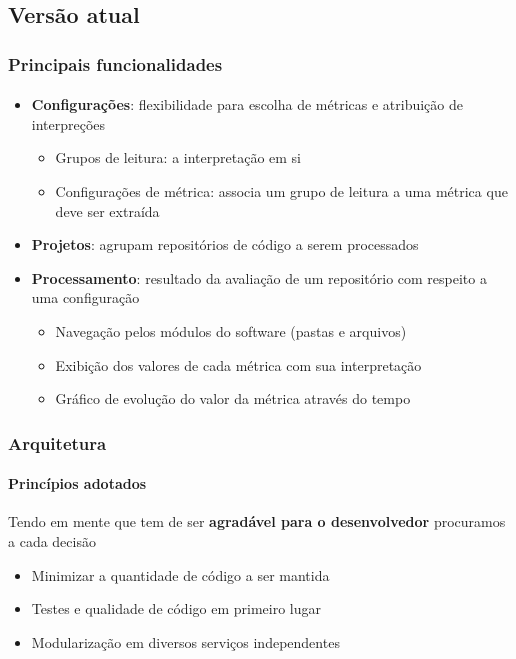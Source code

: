 \documentclass{beamer}
\begin{document}
  \subsection{Versão atual}
  \begin{frame}
    \frametitle{Principais funcionalidades}
    \framesubtitle{}

    \begin{itemize}
      \item \textbf{Configurações}: flexibilidade para escolha de métricas e atribuição de interpreções
        \begin{itemize}
          \item Grupos de leitura: a interpretação em si
          \item Configurações de métrica: associa um grupo de leitura a uma métrica que deve ser extraída
        \end{itemize}
      \item \textbf{Projetos}: agrupam repositórios de código a serem processados
      \item \textbf{Processamento}: resultado da avaliação de um repositório com respeito a uma configuração
        \begin{itemize}
          \item Navegação pelos módulos do software (pastas e arquivos)
          \item Exibição dos valores de cada métrica com sua interpretação
          \item Gráfico de evolução do valor da métrica através do tempo
        \end{itemize}
    \end{itemize}
  \end{frame}

  \begin{frame}
    \frametitle{Arquitetura}
    \framesubtitle{Princípios adotados}

    Tendo em mente que tem de ser \textbf{agradável para o desenvolvedor} procuramos a cada decisão
    \begin{itemize}
      \item Minimizar a quantidade de código a ser mantida
      \item Testes e qualidade de código em primeiro lugar
      \item Modularização em diversos serviços independentes
    \end{itemize}
  \end{frame}
\end{document}
